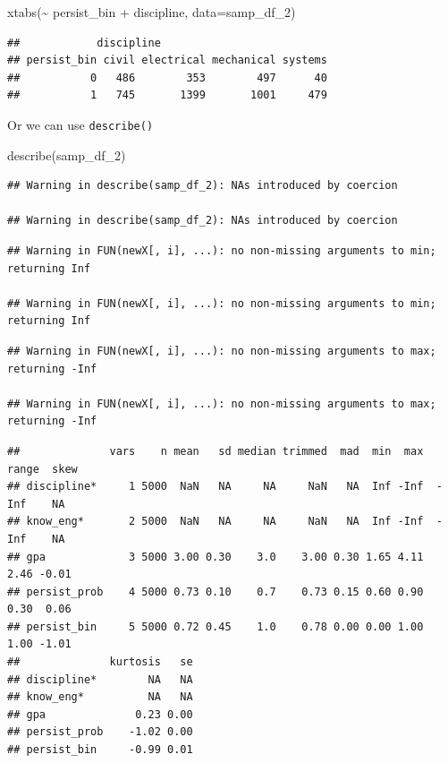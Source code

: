 \documentclass[
]{book}
\newenvironment{Shaded}{\begin{snugshade}}{\end{snugshade}}
\newcommand{\AttributeTok}[1]{\textcolor[rgb]{0.77,0.63,0.00}{#1}}
\newcommand{\FunctionTok}[1]{\textcolor[rgb]{0.00,0.00,0.00}{#1}}
\newcommand{\NormalTok}[1]{#1}
\newcommand{\SpecialCharTok}[1]{\textcolor[rgb]{0.00,0.00,0.00}{#1}}
\begin{document}
\begin{Shaded}
\begin{Highlighting}[]
\FunctionTok{xtabs}\NormalTok{(}\SpecialCharTok{\textasciitilde{}}\NormalTok{ persist\_bin }\SpecialCharTok{+}\NormalTok{ discipline, }\AttributeTok{data=}\NormalTok{samp\_df\_2)}
\end{Highlighting}
\end{Shaded}

\begin{verbatim}
##            discipline
## persist_bin civil electrical mechanical systems
##           0   486        353        497      40
##           1   745       1399       1001     479
\end{verbatim}

Or we can use \texttt{describe()}

\begin{Shaded}
\begin{Highlighting}[]
\FunctionTok{describe}\NormalTok{(samp\_df\_2)}
\end{Highlighting}
\end{Shaded}

\begin{verbatim}
## Warning in describe(samp_df_2): NAs introduced by coercion

## Warning in describe(samp_df_2): NAs introduced by coercion
\end{verbatim}

\begin{verbatim}
## Warning in FUN(newX[, i], ...): no non-missing arguments to min; returning Inf

## Warning in FUN(newX[, i], ...): no non-missing arguments to min; returning Inf
\end{verbatim}

\begin{verbatim}
## Warning in FUN(newX[, i], ...): no non-missing arguments to max; returning -Inf

## Warning in FUN(newX[, i], ...): no non-missing arguments to max; returning -Inf
\end{verbatim}

\begin{verbatim}
##              vars    n mean   sd median trimmed  mad  min  max range  skew
## discipline*     1 5000  NaN   NA     NA     NaN   NA  Inf -Inf  -Inf    NA
## know_eng*       2 5000  NaN   NA     NA     NaN   NA  Inf -Inf  -Inf    NA
## gpa             3 5000 3.00 0.30    3.0    3.00 0.30 1.65 4.11  2.46 -0.01
## persist_prob    4 5000 0.73 0.10    0.7    0.73 0.15 0.60 0.90  0.30  0.06
## persist_bin     5 5000 0.72 0.45    1.0    0.78 0.00 0.00 1.00  1.00 -1.01
##              kurtosis   se
## discipline*        NA   NA
## know_eng*          NA   NA
## gpa              0.23 0.00
## persist_prob    -1.02 0.00
## persist_bin     -0.99 0.01
\end{verbatim}
\end{document}
